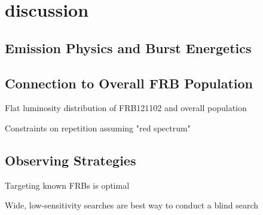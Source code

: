\section{discussion}

\subsection{Emission Physics and Burst Energetics}



\subsection{Connection to Overall FRB Population}

Flat luminosity distribution of FRB121102 and overall population

Constraints on repetition assuming "red spectrum"

\subsection{Observing Strategies}

Targeting known FRBs is optimal

Wide, low-sensitivity searches are best way to conduct a blind search